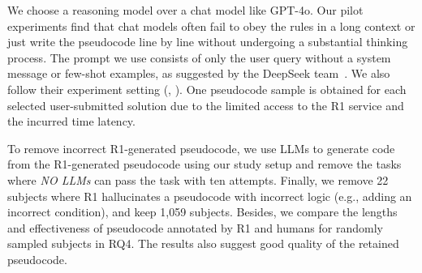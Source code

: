 We choose a reasoning model over a chat model like GPT-4o. Our pilot experiments find that chat models often fail to obey the rules in a long context or just write the pseudocode line by line without undergoing a substantial thinking process.
The prompt we use consists of only the user query without a system message or few-shot examples, as suggested by the DeepSeek team~\cite{ds-r1}.
We also follow their experiment setting (, ).
One pseudocode sample is obtained for each selected user-submitted solution due to the limited access to the R1 service and the incurred time latency.

{To remove incorrect R1-generated pseudocode, we use LLMs to generate code from the R1-generated pseudocode using our study setup and remove the tasks where \emph{NO LLMs} can pass the task with ten attempts.
Finally, we remove 22 subjects where R1 hallucinates a pseudocode with incorrect logic (e.g., adding an incorrect condition), and keep 1,059 subjects.
Besides, we compare the lengths and effectiveness of pseudocode annotated by R1 and humans for randomly sampled subjects in RQ4. The results also suggest good quality of the retained pseudocode.} %
